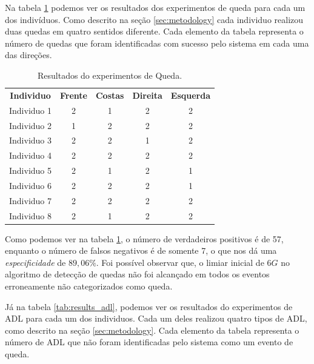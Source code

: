 Na tabela \ref{tab:results_fall} podemos ver os resultados dos experimentos de queda para cada um dos indivíduos. Como descrito na seção \ref{sec:metodology} cada individuo realizou duas quedas em quatro sentidos diferente. Cada elemento da tabela representa o número de quedas que foram identificadas com sucesso pelo sistema em cada uma das direções. 

\begin{table}[h]
	\centering
	\caption{Resultados do experimentos de Queda.}
	\label{tab:results_fall}
	\begin{tabular}{c|c|c|c|c}
		\hline
		\textbf{Individuo}  & \textbf{Frente} 	& \textbf{Costas}   &    \textbf{Direita}    & \textbf{Esquerda} 	 \\
		Individuo 1         & 2        		    & 1            		& 2      		 		 & 2         \\  
		Individuo 2         & 1        		    & 2            		& 2      		 		 & 2         \\
		Individuo 3         & 2        		    & 2            		& 1      		 		 & 2         \\
		Individuo 4         & 2        		    & 2            		& 2      		 		 & 2         \\
		Individuo 5         & 2        		    & 1            		& 2      		 		 & 1         \\
		Individuo 6         & 2        		    & 2            		& 2      		 		 & 1         \\
		Individuo 7         & 2        		    & 2            		& 2      		 		 & 2         \\
		Individuo 8         & 2        		    & 1            		& 2      		 		 & 2         \\
	\end{tabular}
\end{table}


Como podemos ver na tabela \ref{tab:results_fall}, o número de verdadeiros positivos é de 57, enquanto o número de falsos negativos é de somente 7, o que nos dá uma \textit{especificidade} de $89,06\%$. Foi possível observar que, o limiar inicial de $6G$ no algoritmo de detecção de quedas não foi alcançado em todos os eventos erroneamente não categorizados como queda.


Já na tabela \ref{tab:results_adl}, podemos ver os resultados do experimentos de \ac{ADL} para cada um dos individuos. Cada um deles realizou quatro tipos de ADL, como descrito na seção \ref{sec:metodology}. Cada elemento da tabela representa o número de \ac{ADL} que não foram identificadas pelo sistema como um evento de queda. 


